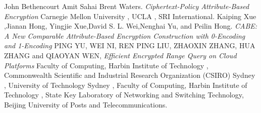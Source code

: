 
\begin{thebibliography}{99}
John Bethencourt Amit Sahai  Brent Waters. \textit{Ciphertext-Policy Attribute-Based Encryption} Carnegie Mellon University , UCLA , SRI International.
Kaiping Xue ,Jianan Hong, Yingjie Xue,David S. L. Wei,Nenghai Yu, and Peilin Hong. \textit{CABE: A New Comparable Attribute-Based
Encryption Construction with 0-Encoding
and 1-Encoding } 
PING YU, WEI NI,
REN PING LIU, 
ZHAOXIN ZHANG,
HUA ZHANG and QIAOYAN WEN,
\textit{Efficient Encrypted Range Query on Cloud Platforms} Faculty of Computing, Harbin Institute of Technology
, Commonwealth Scientific and Industrial Research Organization (CSIRO) Sydney
, University of Technology Sydney
, Faculty of Computing, Harbin Institute of Technology
, State Key Laboratory of Networking and Switching Technology,
Beijing University of Posts and Telecommunications.

\end{thebibliography}
